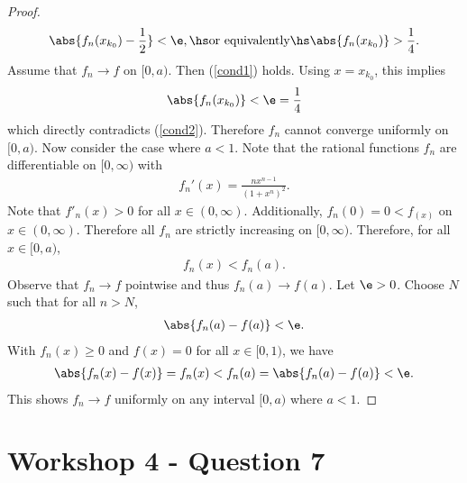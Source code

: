 \documentclass{article}
\begin{document}
\begin{proof}
\begin{align}
      \abs{f_n(x_{k_0}) - \frac{1}{2}} < \e, \hs\text{or equivalently}\hs \abs{f_n(x_{k_0})} > \frac{1}{4}.
   \end{align}
   Assume that $f_n\to f$ on $[0, a)$. Then (\ref{cond1}) holds. Using $x=x_{k_0}$, this implies
   \begin{align*}
      \abs{f_n(x_{k_0})} < \e = \frac{1}{4}
   \end{align*}
   which directly contradicts (\ref{cond2}). Therefore $f_n$ cannot converge uniformly on $[0, a)$.
   Now consider the case where $a<1$.
   Note that the rational functions $f_n$ are differentiable on $[0, \infty)$ with
   \begin{align*}
      f_n'(x) =  \frac{nx^{n-1}}{(1+x^n)^2}.
   \end{align*}
   Note that $f'_n(x)>0$ for all $x\in(0,\infty)$. Additionally, $f_n(0) = 0 < f_(x)$ on $x\in(0, \infty)$.
   Therefore all $f_n$ are strictly increasing on $[0, \infty)$. Therefore, for all $x\in[0,a)$,
   \begin{align}
      f_n(x) < f_n(a).
   \end{align}
   Observe that $f_n\to f$ pointwise and thus $f_n(a)\to f(a)$. Let $\e>0$. Choose $N$ such that
   for all $n>N$,
   \begin{align*}
      \abs{f_n(a)-f(a)} < \e.
   \end{align*}
   With $f_n(x)\geq 0$ and $f(x)=0$ for all $x\in[0,1)$, we have
   \begin{align*}
      \abs{f_n(x)-f(x)}=f_n(x)<f_n(a)=\abs{f_n(a) - f(a)} < \e.
   \end{align*}
   This shows $f_n\to f$ uniformly on any interval $[0, a)$ where $a<1$.
\end{proof}

\section*{Workshop 4 - Question 7}
\end{document}

